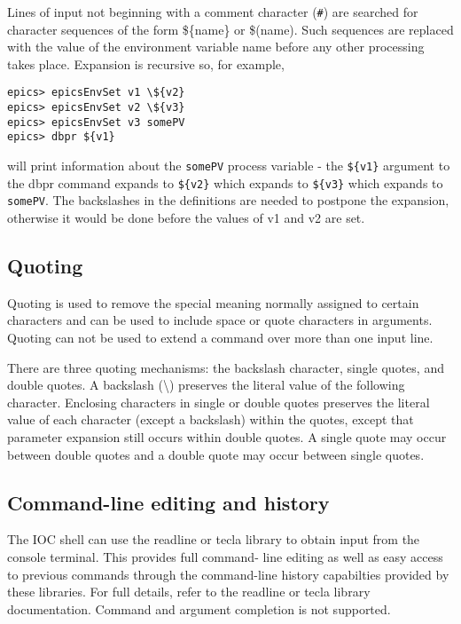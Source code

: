Lines of input not beginning with a comment character (\verb|#|) are searched for character sequences of the form \$\{name\} or 
\$(name).  Such sequences are replaced with the value of the environment variable name before any other processing takes 
place.  Expansion is recursive so, for example,

\begin{verbatim}epics> epicsEnvSet v1 \${v2}
epics> epicsEnvSet v2 \${v3}
epics> epicsEnvSet v3 somePV
epics> dbpr ${v1}
\end{verbatim}will print information about the \verb|somePV| process variable - the \verb|${v1}| argument to the dbpr command expands to 
\verb|${v2}| which expands to \verb|${v3}| which expands to \verb|somePV|.  The backslashes in the definitions are needed to postpone 
the expansion, otherwise it would be done before the values of v1 and v2 are set.

\subsection{Quoting}

Quoting is used to remove the special meaning normally assigned to certain characters and can be used to include space or 
quote characters in arguments. Quoting can not be used to extend a command over more than one input line.

There are three quoting mechanisms: the backslash character, single quotes, and double quotes. A backslash (\textbackslash{}) preserves 
the literal value of the following character. Enclosing characters in single or double quotes preserves the literal value of 
each character (except a backslash) within the quotes, except that parameter expansion still occurs within double quotes.  
A single quote may occur between double quotes and a double quote may occur between single quotes.

\subsection{Command-line editing and history}

The IOC shell can use the readline or tecla library to obtain input from the console terminal. This provides full command-
line editing as well as easy access to previous commands through the command-line history capabilties provided by these 
libraries.  For full details, refer to the readline or tecla library documentation.  Command and argument completion is not 
supported.

